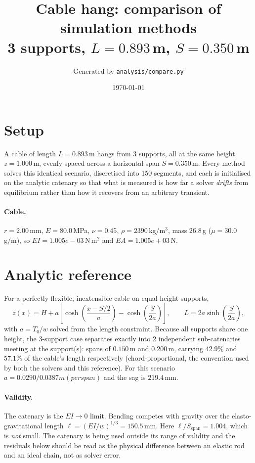 \documentclass[11pt,a4paper]{article}
\title{Cable hang: comparison of simulation methods\\
\large 3 supports, $L = 0.893$\,m,
$S = 0.350$\,m}
\author{Generated by \texttt{analysis/compare.py}}
\date{\today}
\begin{document}
\maketitle

\section{Setup}

A cable of length $L = 0.893$\,m hangs from
3 supports, all at the same height
$z = 1.000$\,m, evenly spaced across a horizontal span
$S = 0.350$\,m. Every method solves this identical scenario,
discretised into 150 segments, and each is initialised on
the analytic catenary so that what is measured is how far a solver
\emph{drifts} from equilibrium rather than how it recovers from an arbitrary
transient.

\paragraph{Cable.} $r = 2.00$\,mm,
$E = 80.0$\,MPa, $\nu = 0.45$,
$\rho = 2390$\,kg/m$^3$, mass $26.8$\,g
($\mu = 30.0$\,g/m), so
$EI = 1.005e-03$\,N\,m$^2$ and
$EA = 1.005e+03$\,N.

\section{Analytic reference}

For a perfectly flexible, inextensible cable on equal-height supports,
\begin{equation}
  z(x) = H + a\left[\cosh\!\left(\frac{x - S/2}{a}\right)
                    - \cosh\!\left(\frac{S}{2a}\right)\right],
  \qquad L = 2a\sinh\!\left(\frac{S}{2a}\right),
\end{equation}
with $a = T_0/w$ solved from the length constraint. Because all supports share
one height, the 3-support case separates exactly into
2 independent sub-catenaries meeting at the support(s):
spans of $0.150$\,m and $0.200$\,m, carrying $42.9\%$ and $57.1\%$ of the cable's length respectively (chord-proportional, the convention used by both the solvers and this reference).
For this scenario $a = 0.0290 / 0.0387 m (per span)$ and the sag is
$219.4$\,mm.

\paragraph{Validity.} The catenary is the $EI \to 0$ limit. Bending competes
with gravity over the elasto-gravitational length
$\ell = (EI/w)^{1/3} = 150.5$\,mm. Here $\ell/S_{\mathrm{span}} = 1.004$, which is \emph{not} small. The catenary is being used outside its range of validity and the residuals below should be read as the physical difference between an elastic rod and an ideal chain, not as solver error.
\end{document}
